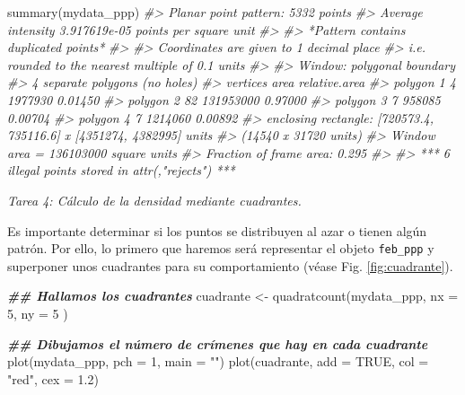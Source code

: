 \documentclass[
]{book}
\newenvironment{Shaded}{\begin{snugshade}}{\end{snugshade}}
\newcommand{\AttributeTok}[1]{\textcolor[rgb]{0.77,0.63,0.00}{#1}}
\newcommand{\CommentTok}[1]{\textcolor[rgb]{0.56,0.35,0.01}{\textit{#1}}}
\newcommand{\ConstantTok}[1]{\textcolor[rgb]{0.00,0.00,0.00}{#1}}
\newcommand{\DecValTok}[1]{\textcolor[rgb]{0.00,0.00,0.81}{#1}}
\newcommand{\DocumentationTok}[1]{\textcolor[rgb]{0.56,0.35,0.01}{\textbf{\textit{#1}}}}
\newcommand{\FloatTok}[1]{\textcolor[rgb]{0.00,0.00,0.81}{#1}}
\newcommand{\FunctionTok}[1]{\textcolor[rgb]{0.00,0.00,0.00}{#1}}
\newcommand{\NormalTok}[1]{#1}
\newcommand{\OtherTok}[1]{\textcolor[rgb]{0.56,0.35,0.01}{#1}}
\newcommand{\StringTok}[1]{\textcolor[rgb]{0.31,0.60,0.02}{#1}}
\begin{document}
\begin{Shaded}
\begin{Highlighting}[]
\FunctionTok{summary}\NormalTok{(mydata\_ppp)}
\CommentTok{\#\textgreater{} Planar point pattern:  5332 points}
\CommentTok{\#\textgreater{} Average intensity 3.917619e{-}05 points per square unit}
\CommentTok{\#\textgreater{} }
\CommentTok{\#\textgreater{} *Pattern contains duplicated points*}
\CommentTok{\#\textgreater{} }
\CommentTok{\#\textgreater{} Coordinates are given to 1 decimal place}
\CommentTok{\#\textgreater{} i.e. rounded to the nearest multiple of 0.1 units}
\CommentTok{\#\textgreater{} }
\CommentTok{\#\textgreater{} Window: polygonal boundary}
\CommentTok{\#\textgreater{} 4 separate polygons (no holes)}
\CommentTok{\#\textgreater{}            vertices      area relative.area}
\CommentTok{\#\textgreater{} polygon 1         4   1977930       0.01450}
\CommentTok{\#\textgreater{} polygon 2        82 131953000       0.97000}
\CommentTok{\#\textgreater{} polygon 3         7    958085       0.00704}
\CommentTok{\#\textgreater{} polygon 4         7   1214060       0.00892}
\CommentTok{\#\textgreater{} enclosing rectangle: [720573.4, 735116.6] x [4351274, 4382995] units}
\CommentTok{\#\textgreater{}                      (14540 x 31720 units)}
\CommentTok{\#\textgreater{} Window area = 136103000 square units}
\CommentTok{\#\textgreater{} Fraction of frame area: 0.295}
\CommentTok{\#\textgreater{} }
\CommentTok{\#\textgreater{} *** 6 illegal points stored in attr(,"rejects") ***}
\end{Highlighting}
\end{Shaded}

\emph{Tarea 4: Cálculo de la densidad mediante cuadrantes.}

Es importante determinar si los puntos se distribuyen al azar o tienen algún
patrón. Por ello, lo primero que haremos será representar el objeto \texttt{feb\_ppp} y
superponer unos cuadrantes para su comportamiento (véase Fig.
\ref{fig:cuadrante}).

\begin{Shaded}
\begin{Highlighting}[]
\DocumentationTok{\#\# Hallamos los cuadrantes}
\NormalTok{cuadrante }\OtherTok{\textless{}{-}} \FunctionTok{quadratcount}\NormalTok{(mydata\_ppp,}
  \AttributeTok{nx =} \DecValTok{5}\NormalTok{,}
  \AttributeTok{ny =} \DecValTok{5}
\NormalTok{)}

\DocumentationTok{\#\# Dibujamos el número de crímenes que hay en cada cuadrante}
\FunctionTok{plot}\NormalTok{(mydata\_ppp, }\AttributeTok{pch =} \DecValTok{1}\NormalTok{, }\AttributeTok{main =} \StringTok{""}\NormalTok{)}
\FunctionTok{plot}\NormalTok{(cuadrante, }\AttributeTok{add =} \ConstantTok{TRUE}\NormalTok{, }\AttributeTok{col =} \StringTok{"red"}\NormalTok{, }\AttributeTok{cex =} \FloatTok{1.2}\NormalTok{)}
\end{Highlighting}
\end{Shaded}
\end{document}
